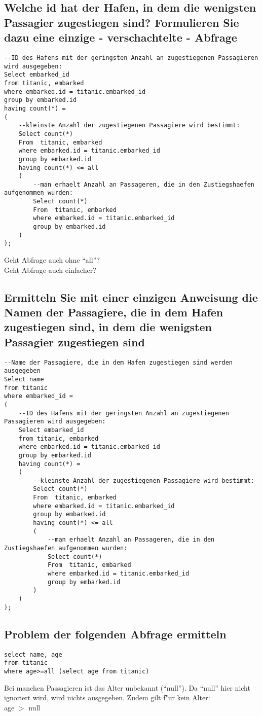 \documentclass[a4paper, 11pt, titlepage]{article}
\begin{document}
\subsection{Welche id hat der Hafen, in dem die wenigsten Passagier zugestiegen sind? Formulieren Sie 
dazu eine einzige - verschachtelte - Abfrage}
\begin{lstlisting}[style = sql]
--ID des Hafens mit der geringsten Anzahl an zugestiegenen Passagieren wird ausgegeben:
Select embarked_id
from titanic, embarked
where embarked.id = titanic.embarked_id
group by embarked.id
having count(*) =
(
	--kleinste Anzahl der zugestiegenen Passagiere wird bestimmt:
	Select count(*)
	From  titanic, embarked
	where embarked.id = titanic.embarked_id
	group by embarked.id
	having count(*) <= all
	(
		--man erhaelt Anzahl an Passageren, die in den Zustiegshaefen aufgenommen wurden:
		Select count(*)
		From  titanic, embarked
		where embarked.id = titanic.embarked_id
		group by embarked.id	
	)
);
\end{lstlisting}
Geht Abfrage auch ohne "`all"'?\\
Geht Abfrage auch einfacher?
\newpage
\subsection{Ermitteln Sie mit einer einzigen Anweisung die Namen der Passagiere, die in dem Hafen 
zugestiegen sind, in dem die wenigsten Passagier zugestiegen sind}
\begin{lstlisting}[style = sql]
--Name der Passagiere, die in dem Hafen zugestiegen sind werden ausgegeben
Select name
from titanic
where embarked_id = 
(
	--ID des Hafens mit der geringsten Anzahl an zugestiegenen Passagieren wird ausgegeben:
	Select embarked_id
	from titanic, embarked
	where embarked.id = titanic.embarked_id
	group by embarked.id
	having count(*) =
	(
		--kleinste Anzahl der zugestiegenen Passagiere wird bestimmt:
		Select count(*)
		From  titanic, embarked
		where embarked.id = titanic.embarked_id
		group by embarked.id
		having count(*) <= all
		(
			--man erhaelt Anzahl an Passageren, die in den Zustiegshaefen aufgenommen wurden:
			Select count(*)
			From  titanic, embarked
			where embarked.id = titanic.embarked_id
			group by embarked.id	
		)
	)
);
\end{lstlisting}
\subsection{Problem der folgenden Abfrage ermitteln}
\begin{lstlisting}[style = sql]
select name, age 
from titanic 
where age>=all (select age from titanic)
\end{lstlisting}
Bei manchen Passagieren ist das Alter unbekannt ("`null"'). Da "`null"' hier nicht ignoriert wird, wird nichts ausgegeben. Zudem gilt f"ur kein Alter:\\
age $>$ null
\end{document}
